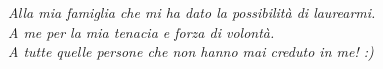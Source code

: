 \null{}
\begin{flushright}
	\begin{Small}
	\textit{Alla mia famiglia che mi ha dato la possibilità di laurearmi.} \\
	\textit{A me per la mia tenacia e forza di volontà.} \\
	\textit{A tutte quelle persone che non hanno mai creduto in me! :)} \\
	\end{Small}
\end{flushright}
\null